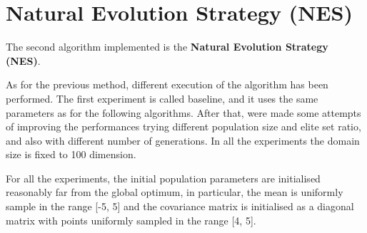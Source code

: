 \section{Natural Evolution Strategy (NES)}

The second algorithm implemented is the \textbf{Natural Evolution Strategy (NES)}. 

As for the previous method, different execution of the algorithm has been performed. The first experiment is called baseline, and it uses the same parameters as for the following algorithms. After that, were made some attempts of improving the performances trying different population size and elite set ratio, and also with different number of generations. In all the experiments the domain size is fixed to 100 dimension.

For all the experiments, the initial population parameters are initialised reasonably far from the global optimum, in particular, the mean is uniformly sample in the range [-5, 5] and the covariance matrix is initialised as a diagonal matrix with points uniformly sampled in the range [4, 5].

